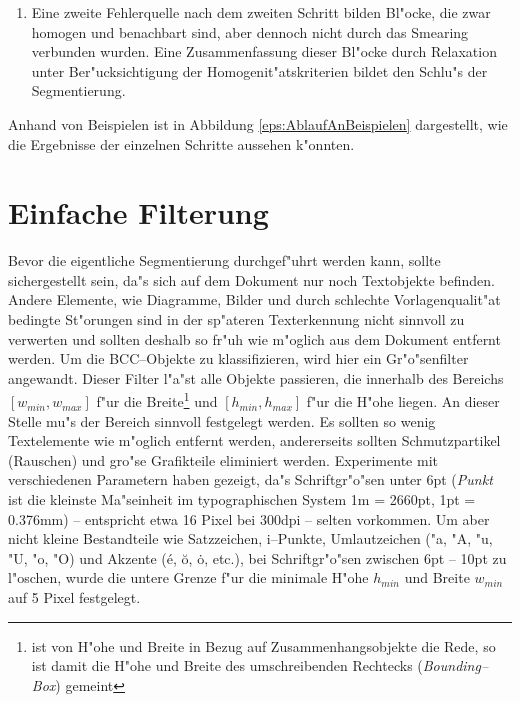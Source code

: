 \begin{enumerate}
  \item Eine zweite Fehlerquelle nach dem zweiten Schritt bilden Bl"ocke, die zwar homogen und benachbart
        sind, aber dennoch nicht durch das Smearing
        verbunden wurden. Eine Zusammenfassung dieser Bl"ocke durch Relaxation unter Ber"ucksichtigung
        der Homogenit"atskriterien bildet den Schlu"s der Segmentierung.
\end{enumerate}

\clearpage
Anhand von Beispielen ist in Abbildung \ref{eps:AblaufAnBeispielen} dargestellt,
wie die Ergebnisse der einzelnen Schritte aussehen k"onnten.
\section{Einfache Filterung} \label{Filterung}

Bevor die eigentliche Segmentierung durchgef"uhrt werden kann, sollte sichergestellt sein, da"s
sich auf dem Dokument nur noch Textobjekte befinden. Andere Elemente, wie Diagramme,
Bilder und durch schlechte Vorlagenqualit"at bedingte St"orungen sind in der sp"ateren Texterkennung
nicht sinnvoll zu verwerten und sollten deshalb so fr"uh wie m"oglich aus dem Dokument
entfernt werden. Um die BCC--Objekte zu klassifizieren, wird hier ein Gr"o"senfilter
angewandt. Dieser Filter l"a"st alle Objekte passieren, die innerhalb des Bereichs
$[w_{min}, w_{max}]$ f"ur die Breite\footnote{ist von H"ohe und Breite in Bezug auf
  Zusammenhangsobjekte die Rede, so ist damit die H"ohe und Breite des umschreibenden
  Rechtecks ({\em Bounding--Box\/}) gemeint} und $[h_{min}, h_{max}]$ f"ur die H"ohe liegen.
An dieser Stelle mu"s der Bereich sinnvoll festgelegt werden. Es sollten so wenig
Textelemente wie m"oglich entfernt werden, andererseits sollten Schmutzpartikel (Rauschen) und
gro"se Grafikteile eliminiert werden. Experimente mit verschiedenen Parametern haben gezeigt, da"s
Schriftgr"o"sen unter 6pt ({\em Punkt\/} ist die kleinste Ma"seinheit im typographischen System
1m = 2660pt, 1pt = 0.376mm) -- entspricht etwa 16 Pixel bei 300dpi -- selten vorkommen.
Um aber nicht kleine Bestandteile wie Satzzeichen, i--Punkte,
Umlautzeichen ("a, "A, "u, "U, "o, "O) und Akzente (\'{e}, \u{o}, \.o, etc.), bei Schriftgr"o"sen
zwischen 6pt -- 10pt zu l"oschen, wurde die untere Grenze f"ur die minimale H"ohe $h_{min}$ und
Breite $w_{min}$ auf 5 Pixel festgelegt.

